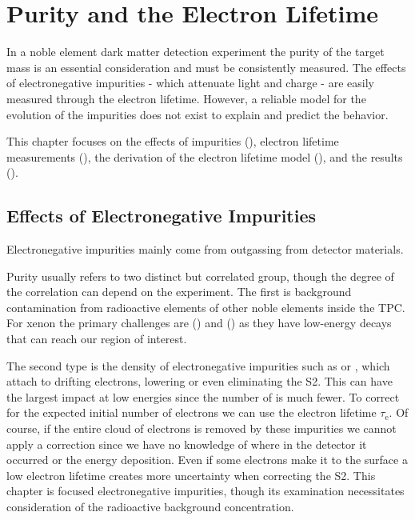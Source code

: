 

\pagestyle{cu}
\graphicspath{{./Chapter4/Figures/}}
\chapter[Purity and the Electron Lifetime][Purity and the Electron Lifetime]{Purity and the Electron Lifetime}
\label{chap:purification}

In a noble element dark matter detection experiment the purity of the target mass is an essential consideration and must be consistently
measured.  The effects of electronegative impurities - which attenuate light and charge - are easily measured through the electron
lifetime.  However, a reliable model for the evolution of the impurities does not exist to explain and predict the behavior.

This chapter focuses on the effects of impurities (), electron lifetime measurements
(), the derivation of the electron lifetime model (), and
the results (\secref{}).



\section{Effects of Electronegative Impurities}
\label{sec:importance_procedure_effects}
Electronegative impurities mainly come from outgassing from detector materials.

Purity usually refers to two distinct but correlated group, though the degree of the correlation can depend on the
experiment.  The first is background contamination from radioactive elements of other noble elements inside the TPC.  For xenon
the primary challenges are  () and 
() as they have low-energy decays that can reach our region of interest.

The second type is the density of electronegative impurities such as  or
, which attach to drifting electrons, lowering or even eliminating the S2.  This can have the largest impact at low energies
since the number of \electron is much fewer.  To correct for the expected initial number of electrons we can use the electron lifetime
$\tau_{\mathrm{e}}$.  Of course, if the entire cloud of electrons is
removed by these impurities we cannot apply a correction since we have no knowledge of where in the detector it occurred or the energy
deposition.  Even if some electrons make it to the surface a low electron lifetime creates more uncertainty when correcting the S2.  This
chapter is focused electronegative impurities, though its examination necessitates consideration of the radioactive background
concentration.

